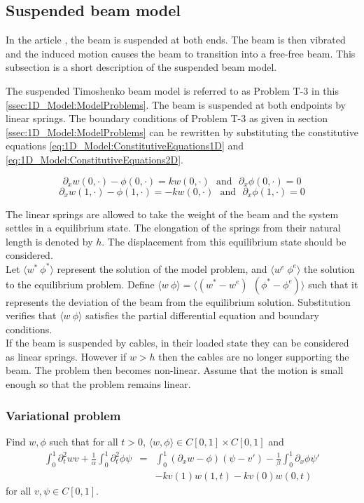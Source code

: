 \documentclass[../../main.tex]{subfiles}
\begin{document}
\subsection{Suspended beam model}
In the article \cite{SP06}, the beam is suspended at both ends. The beam is then vibrated and the induced motion causes the beam to transition into a free-free beam. This subsection is a short description of the suspended beam model.

The suspended Timoshenko beam model is referred to as Problem T-3 in this \ref{ssec:1D_Model:ModelProblems}. The beam is suspended at both endpoints by linear springs. The boundary conditions of Problem T-3 as given in section \ref{ssec:1D_Model:ModelProblems} can be rewritten by substituting the constitutive equations \eqref{eq:1D_Model:ConstitutiveEquations1D} and \eqref{eq:1D_Model:ConstitutiveEquations2D}.

	\[\partial_{x}w(0,\cdot) - \phi(0,\cdot) = kw(0,\cdot)  \ \ \ \textrm{and} \ \ \ \partial_{x}\phi(0,\cdot) = 0\]
	\[\partial_{x}w(1,\cdot) - \phi(1,\cdot) = -kw(0,\cdot) \ \  \ \textrm{and} \ \ \ \partial_{x}\phi(1,\cdot) = 0\]

The linear springs are allowed to take the weight of the beam and the system settles in a equilibrium state. The elongation of the springs from their natural length is denoted by $h$. The displacement from this equilibrium state should be considered.\\ 

Let $\langle w^* \ \phi^*\rangle$ represent the solution of the model problem, and $\langle w^e \ \phi^e \rangle$ the solution to the equilibrium problem. Define $\langle w \ \phi\rangle = \langle(w^*-w^e) \ \ (\phi^*-\phi^e)\rangle$ such that it represents the deviation of the beam from the equilibrium solution. Substitution verifies that $\langle w \ \phi\rangle$ satisfies the partial differential equation and boundary conditions.\\

If the beam is suspended by cables, in their loaded state they can be considered as linear springs. However if $w > h$ then the cables are no longer supporting the beam. The problem then becomes non-linear. Assume that the motion is small enough so that the problem remains linear.

\subsubsection{Variational problem}
Find $w,\phi$ such that for all $t>0$, $\langle w,\phi \rangle \in C[0,1]\times C[0,1]$ and
\begin{eqnarray*}
	\int_{0}^{1} \partial_{t}^{2} wv + \frac{1}{\alpha}\int_{0}^{1}  \partial_{t}^{2} \phi \psi &=& \int_{0}^{1} (\partial_{x}w - \phi)(\psi -v')  - \frac{1}{\beta}\int_{0}^{1}\partial_{x}\phi \psi'\\
	& & - kv(1)w(1,t) - kv(0)w(0,t)
\end{eqnarray*} for all $v,\psi \in C[0,1]$.\\
\end{document}
